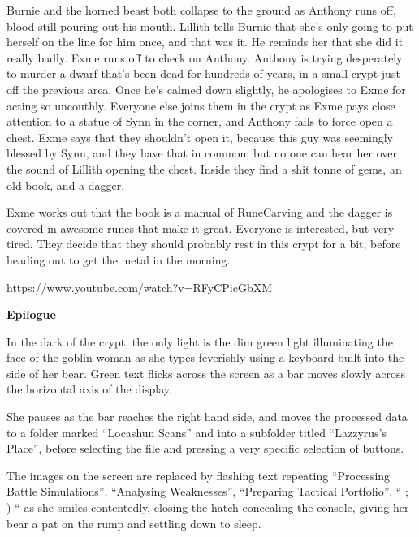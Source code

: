 Burnie and the horned beast both collapse to the ground as Anthony runs off, blood still pouring out his mouth. Lillith tells Burnie that she’s only going to put herself on the line for him once, and that was it. He reminds her that she did it really badly. Exme runs off to check on Anthony. Anthony is trying desperately to murder a dwarf that’s been dead for hundreds of years, in a small crypt just off the previous area. Once he’s calmed down slightly, he apologises to Exme for acting so uncouthly. Everyone else joins them in the crypt as Exme pays close attention to a statue of Synn in the corner, and Anthony fails to force open a chest. Exme says that they shouldn’t open it, because this guy was seemingly blessed by Synn, and they have that in common, but no one can hear her over the sound of Lillith opening the chest. Inside they find a shit tonne of gems, an old book, and a dagger.\medskip

Exme works out that the book is a manual of RuneCarving and the dagger is covered in awesome runes that make it great. Everyone is interested, but very tired. They decide that they should probably rest in this crypt for a bit, before heading out to get the metal in the morning. \medskip

https://www.youtube.com/watch?v=RFyCPicGbXM\medskip

\textbf{Epilogue}\medskip

In the dark of the crypt, the only light is the dim green light illuminating the face of the goblin woman as she types feverishly using a keyboard built into the side of her bear. Green text flicks across the screen as a bar moves slowly across the horizontal axis of the display.\medskip

She pauses as the bar reaches the right hand side, and moves the processed data to a folder marked “Locashun Scans” and into a subfolder titled “Lazzyrus’s Place”, before selecting the file and pressing a very specific selection of buttons.\medskip

The images on the screen are replaced by flashing text repeating “Processing Battle Simulations”, “Analysing Weaknesses”, “Preparing Tactical Portfolio”, “ ; ) “ as she smiles contentedly, closing the hatch concealing the console, giving her bear a pat on the rump and settling down to sleep.\medskip

\vspace*{5mm}

